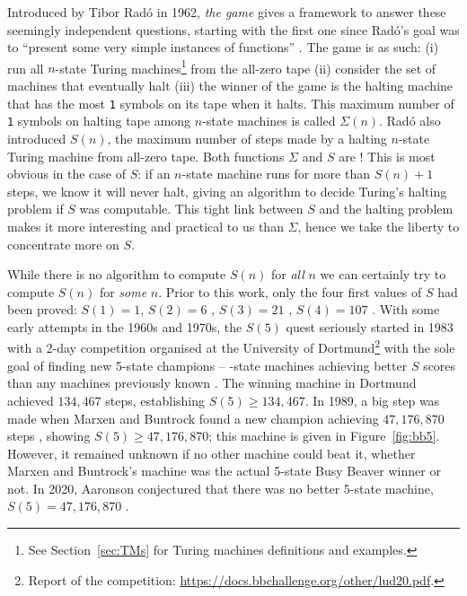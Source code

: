 \documentclass[a4paper,british]{article}
\theoremstyle{definition} %
\numberwithin{equation}{section}
\theoremstyle{definition} %
\newcommand{\sone}{\texttt{1}\xspace}
\newcommand{\BBtheFifth}{47{,}176{,}870}
\newcommand{\radofull}{Tibor Rad\'o\xspace}
\newcommand{\rado}{Rad\'o\xspace}
\begin{document}
Introduced by \radofull in 1962, \textit{the \BBfull game} gives a framework to answer these seemingly independent questions, starting with the first one since \rado's goal was to ``present some very simple instances of \noncomput functions'' \cite{Rado_1962}. The game is as such: (i) run all $n$-state Turing machines\footnote{See Section~\ref{sec:TMs} for Turing machines definitions and examples.} from the all-zero tape (ii) consider the set of machines that eventually halt (iii) the winner of the game is the halting machine that has the most \sone symbols on its tape when it halts. This maximum number of \sone symbols on halting tape among $n$-state machines is called $\Sigma(n)$. \rado also introduced $S(n)$, the maximum number of steps made by a halting $n$-state Turing machine from all-zero tape. Both functions $\Sigma$ and $S$ are \noncomput! This is most obvious in the case of $S$: if an $n$-state machine runs for more than $S(n)+1$ steps, we know it will never halt, giving an algorithm to decide Turing's halting problem if $S$ was computable. This tight link between $S$ and the halting problem makes it more interesting and practical to us than $\Sigma$, hence we take the liberty to concentrate more on $S$.

While there is no algorithm to compute $S(n)$ for \textit{all} $n$ we can certainly try to compute $S(n)$ for \textit{some} $n$. Prior to this work, only the four first values of $S$ had been proved: $S(1)=1$, $S(2)=6$ \cite{Rado_1962}, $S(3) = 21$ \cite{Lin1963}, $S(4) = 107$ \cite{Brady83}. With some early attempts in the 1960s and 1970s, the $S(5)$ quest seriously started in 1983 with a 2-day competition organised at the University of Dortmund\footnote{Report of the competition: \url{https://docs.bbchallenge.org/other/lud20.pdf}.} with the sole goal of finding new 5-state champions -- -state machines achieving better $S$ scores than any machines previously known \cite{PMichel_website,michel2019busy}. The winning machine in Dortmund achieved $134,467$ steps, establishing $S(5) \geq 134,467$. In 1989, a big step was made when Marxen and Buntrock found a new champion achieving $\BBtheFifth$ steps \cite{Marxen_1990}, showing $S(5) \geq \BBtheFifth$; this machine is given in Figure~\ref{fig:bb5}. However, it remained unknown if no other machine could beat it, \ie whether Marxen and Buntrock's machine was the actual 5-state Busy Beaver winner or not. In 2020, Aaronson conjectured that there was no better 5-state machine, \ie $S(5) = \BBtheFifth$ \cite{BusyBeaverFrontier}.
\end{document}
